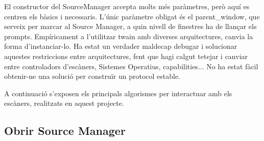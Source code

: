 \documentclass[letterpaper,11pt,catalan]{sphinxmanual}
\begin{document}
El constructor del SourceManager accepta molts més paràmetres, però aquí es centren
els bàsics i necessaris. L'únic paràmetre obligat és el parent\_window, que serveix per marcar
al Source Manager, a quin nivell de finestres ha de llançar els prompts.
Empíricament a l'utilitzar twain amb diverses arquitectures, canvia la forma d'instanciar-lo.
Ha estat un verdader maldecap debugar i solucionar aquestes restriccions entre arquitectures,
fent que hagi calgut \sphinxquotedblleft{}tetejar\sphinxquotedblright{} i canviar entre controladors d'escàners, Sistemes Operatius,
capabilities... No ha estat fàcil obtenir-ne una solució per construïr un protocol estable.

A continuació s'exposen els principals algorismes per interactuar amb els escàners,
realitzats en aquest projecte.


\subsection{Obrir Source Manager}
\label{\detokenize{index:obrir-source-manager}}
\begin{sphinxVerbatim}[commandchars=\\\{\}]
   
       
            
       
            
            
         
            
\end{sphinxVerbatim}
\end{document}
